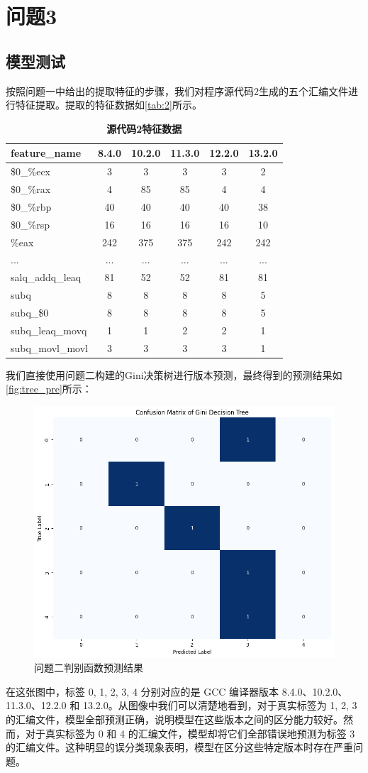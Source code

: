 
\section{问题3}
\subsection{模型测试}
按照问题一中给出的提取特征的步骤，我们对程序源代码2生成的五个汇编文件进行特征提取。提取的特征数据如\autoref{tab:2}所示。
\begin{table}[H]
\caption{\textbf{源代码2特征数据}}%
\label{tab:2}
\centering%
\begin{tabular}{lccccc}%
\toprule%
 feature\_name&8.4.0 & 10.2.0 & 11.3.0 & 12.2.0 & 13.2.0 \\ 
\midrule%
\$0\_\%ecx&3&3&3&3&2 \\
\$0\_\%rax&4 & 85 & 85 & 4 & 4 \\
\$0\_\%rbp&40 & 40 & 40 & 40 & 38 \\
\$0\_\%rsp&16 & 16 & 16 & 16 & 10 \\
\%eax & 242 & 375 & 375 & 242&242 \\
...&... & ... & ... & ... & ... \\
salq\_addq\_leaq&81 & 52 & 52 & 81 & 81 \\
subq&8 & 8 & 8 & 8 & 5 \\
subq\_\$0&8 & 8 & 8 & 8 & 5 \\
subq\_leaq\_movq&1 & 1 & 2 & 2 & 1 \\
subq\_movl\_movl&3 & 3 & 3 & 3 & 1 \\
\bottomrule%
\end{tabular}
\end{table}

我们直接使用问题二构建的Gini决策树进行版本预测，最终得到的预测结果如\autoref{fig:tree_pre}所示：
\begin{figure}[H]
    \centering
    \includegraphics[width=0.75\linewidth]{figures/tree_pre.png}
    \caption{问题二判别函数预测结果}
    \label{fig:tree_pre}
\end{figure}
在这张图中，标签 0, 1, 2, 3, 4 分别对应的是 GCC 编译器版本 8.4.0、10.2.0、11.3.0、12.2.0 和 13.2.0。从图像中我们可以清楚地看到，对于真实标签为 1, 2, 3 的汇编文件，模型全部预测正确，说明模型在这些版本之间的区分能力较好。然而，对于真实标签为 0 和 4 的汇编文件，模型却将它们全部错误地预测为标签 3 的汇编文件。这种明显的误分类现象表明，模型在区分这些特定版本时存在严重问题。

